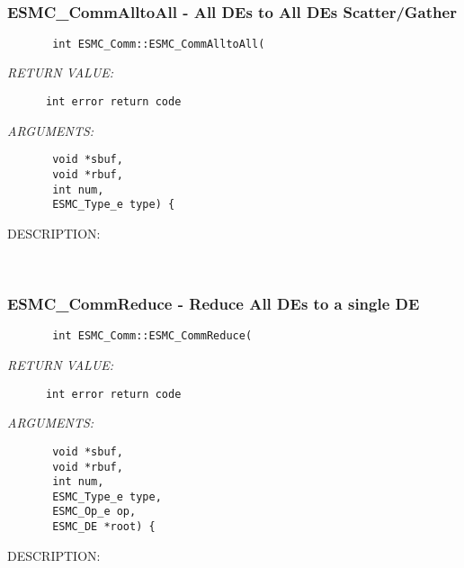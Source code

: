         
   
 
\mbox{}\hrulefill\ 
 
\subsubsection{ESMC\_CommAlltoAll - All DEs to All DEs Scatter/Gather}


  
\begin{verbatim}       int ESMC_Comm::ESMC_CommAlltoAll(\end{verbatim}{\em RETURN VALUE:}
\begin{verbatim}      int error return code\end{verbatim}{\em ARGUMENTS:}
\begin{verbatim}       void *sbuf,
       void *rbuf,
       int num,
       ESMC_Type_e type) {\end{verbatim}
{\sf DESCRIPTION:\\ }


        
   
 
\mbox{}\hrulefill\ 
 
\subsubsection{ESMC\_CommReduce - Reduce All DEs to a single DE}


  
\begin{verbatim}       int ESMC_Comm::ESMC_CommReduce(\end{verbatim}{\em RETURN VALUE:}
\begin{verbatim}      int error return code\end{verbatim}{\em ARGUMENTS:}
\begin{verbatim}       void *sbuf,
       void *rbuf,
       int num,
       ESMC_Type_e type,
       ESMC_Op_e op,
       ESMC_DE *root) {\end{verbatim}
{\sf DESCRIPTION:\\ }


        
  
